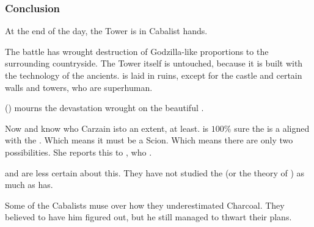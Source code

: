 % 
% 
% 





\subsubsection{Conclusion}
At the end of the day, the Tower is in Cabalist hands. 

The battle has wrought destruction of Godzilla-like proportions to the surrounding countryside. The Tower itself is untouched, because it is built with the technology of the ancients. \Forclin{} is laid in ruins, except for the castle and certain walls and towers, who are superhuman. 

\Nzessuacrith{} () mourns the devastation wrought on the beautiful \Forclin. 

Now \Achsah{} and \Nzessuacrith{} know who Carzain is\dash to an extent, at least.
\Achsah{} is $100\%$ sure the \vertex{} is a \sathariah{} aligned with the . 
Which means it must be a Scion. 
Which means there are only two possibilities. 
She reports this to \Azraid, who . 

\Nzessuacrith{} and \Ishnaruchaefir{} are less certain about this. 
They have not studied the \vertex{} (or the theory of \malachim) as much as \Achsah{} has. 

Some of the Cabalists muse over how they underestimated Charcoal. 
They believed to have him figured out, but he still managed to thwart their plans. 


